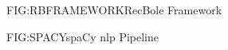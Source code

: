 \begin{figure}[RecBole Framework]{FIG:RBFRAMEWORK}{RecBole Framework~\cite{RECBOLE}}
\end{figure}

\vspace{4em}

\begin{figure}[spaCy NLP Pipeline]{FIG:SPACY}{spaCy \acs{nlp} Pipeline}
\end{figure}